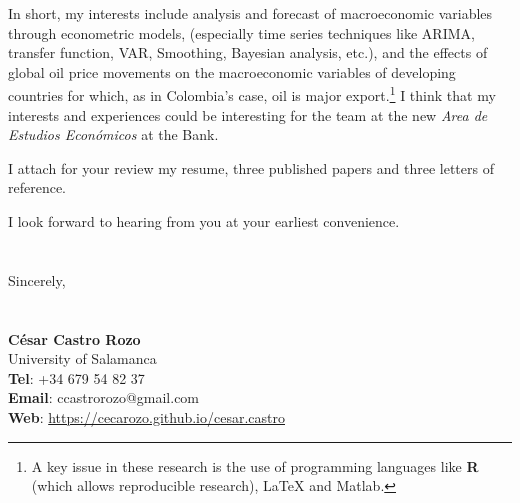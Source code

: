 \documentclass{letter}\usepackage[]{graphicx}\usepackage[]{color}
\begin{document}
In short, my interests include analysis and forecast of macroeconomic variables through econometric models, (especially time series techniques like ARIMA, transfer function, VAR, Smoothing, Bayesian analysis, etc.), and the effects of global oil price movements on the macroeconomic variables of developing countries for which, as in Colombia's case, oil is major export.\footnote{A key issue in these research is the use of programming languages like \textbf{\textsf{R}} (which allows reproducible research), {\LaTeX} and Matlab.} I think that my interests and experiences could be interesting for the team at the new \emph{Area de Estudios Económicos} at the Bank. 

I attach for your review my resume, three published papers and three letters of reference. 


I look forward to hearing from you at your earliest convenience.\\
\\
\\
Sincerely,\\
\\
\\
\textbf{César Castro Rozo}\\
University of Salamanca\\
\textbf{Tel}: +34 679 54 82 37\\
\textbf{Email}: ccastrorozo@gmail.com\\
\textbf{Web}: \href{https://cecarozo.github.io/cesar.castro}{https://cecarozo.github.io/cesar.castro}



\end{document}

